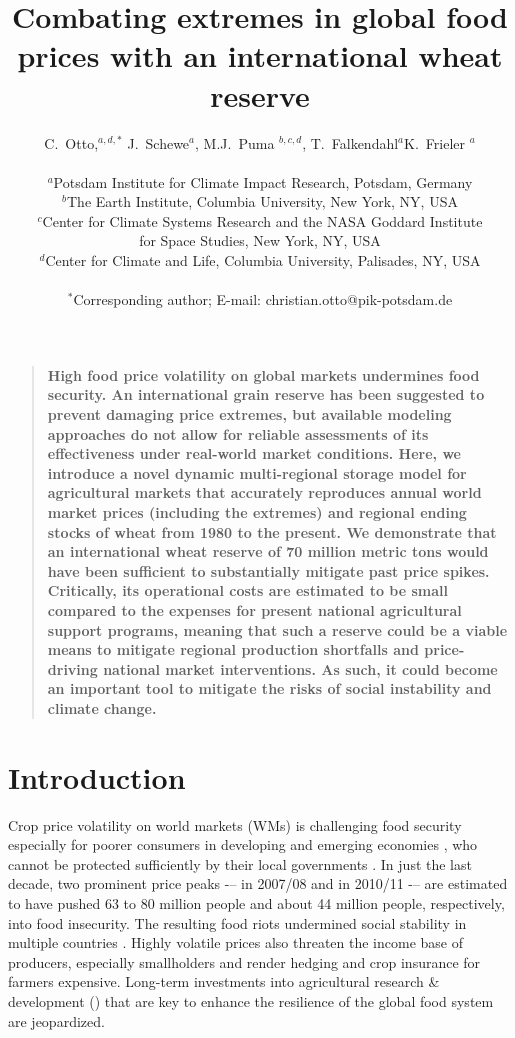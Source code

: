 \documentclass[12pt]{article}
\title{Combating extremes in global food prices with an international wheat reserve}
\author
{C.~Otto,$^{a,d,\ast}$ J.~Schewe$^{a}$, M.J.~Puma $^{b,c,d}$, T.~Falkendahl$^{a}$K.~Frieler $^{a}$\\
  \\
  \normalsize{ $^{a}$Potsdam Institute for Climate Impact Research, Potsdam, Germany}\\
  \normalsize{ $^{b}$The Earth Institute, Columbia University, New York, NY, USA}\\
  \normalsize{ $^{c}$Center for Climate Systems Research and the NASA Goddard Institute}\\
  \normalsize{for Space Studies, New York, NY, USA}\\
  \normalsize{$^{d}$Center for Climate and Life, Columbia University, Palisades, NY, USA}\\
  \\
  \normalsize{$^\ast$Corresponding author; E-mail: christian.otto@pik-potsdam.de} }
\date{}
\newenvironment{natabstract}{%
\begin{quote} \bf}
{\end{quote}}
\begin{document}
 


\baselineskip24pt


\maketitle 

\begin{natabstract} %
High food price volatility on global markets undermines food security. An international grain reserve has been suggested to prevent damaging price extremes, but available modeling approaches do not allow for reliable assessments of its effectiveness under real-world market conditions. Here, we introduce a novel dynamic multi-regional storage model for agricultural markets that accurately reproduces annual world market prices (including the extremes) and regional ending stocks of wheat from 1980 to the present. We demonstrate that an international wheat reserve of 70 million metric tons would have been sufficient to substantially mitigate past price spikes. Critically, its operational costs are estimated to be small compared to the expenses for present national agricultural support programs, meaning that such a reserve could be a viable means to mitigate regional production shortfalls and price-driving national market interventions. As such, it could become an important tool to mitigate the risks of social instability and climate change.
\end{natabstract}


\section*{Introduction}
Crop price volatility on world markets (WMs) is challenging food security especially for poorer consumers in developing and emerging economies \cite{BRA08}, who cannot be protected sufficiently by their local governments \cite{HLPE11}. In just the last decade, two prominent price peaks -– in 2007/08 and in 2010/11 -– are estimated to have pushed 63 \cite{TIW10} to 80 \cite{FAO08} million people and about 44 million people, respectively, into food insecurity. The resulting food riots undermined social stability in multiple countries \cite{BER13}. Highly volatile prices also threaten the income base of producers, especially smallholders \cite{HLPE11} and render hedging and crop insurance for farmers expensive. Long-term investments into agricultural research \& development (\RD) that are key to enhance the resilience of the global food system \cite{GOD10,FED10} are jeopardized.
\end{document}
